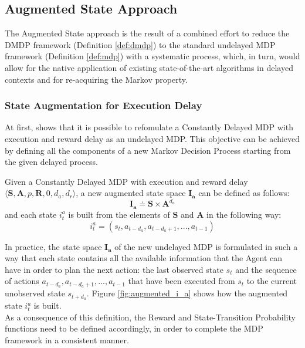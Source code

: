         \subsection{Augmented State Approach}
            \label{subs:augmentedapproach}
            The Augmented State approach is the result of a combined effort to reduce the DMDP framework (Definition \ref{def:dmdp}) to the standard undelayed MDP framework (Definition \ref{def:mdp}) with a systematic process, which, in turn, would allow for the native application of existing state-of-the-art algorithms in delayed contexts and for re-acquiring the Markov property.
            
            \subsubsection{State Augmentation for Execution Delay}
                At first,  shows that it is possible to refomulate a Constantly Delayed MDP with execution and reward delay as an undelayed MDP. This objective can be achieved by defining all the components of a new Markov Decision Process starting from the given delayed process.
                
                \begin{definition}
                    \label{def:execaugmentstate}
                    Given a Constantly Delayed MDP with execution and reward delay $\langle \mathbf{S}, \mathbf{A}, p, \mathbf{R}, 0, d_a, d_r \rangle$,
                    a new augmented state space $\mathbf{I_{a}}$ can be defined as follows:
                    \[ \mathbf{I_{a}} \doteq \mathbf{S} \times \mathbf{A}^{d_a} \]
                    and each state $i^a_t$ is built from the elements of $\mathbf{S}$ and $\mathbf{A}$ in the following way:
                    \[ i_t^a = \left( s_t, a_{t-d_{a}}, a_{t-d_{a}+1}, ..., a_{t-1} \right)\]
                \end{definition}
                
                In practice, the state space $\mathbf{I_{a}}$ of the new undelayed MDP is formulated in such a way that each state contains all the available information that the Agent can have in order to plan the next action: the last observed state $s_t$ and the sequence of actions ${a_{t-d_{a}}, a_{t-d_{a}+1}, ..., a_{t-1}}$ that have been executed from $s_t$ to the current unobserved state $s_{t+d_{a}}$. Figure \ref{fig:augmented_i_a} shows how the augmented state $i_t^a$ is built. 
                \\
                As a consequence of this definition, the Reward and State-Transition Probability functions need to be defined accordingly, in order to complete the MDP framework in a consistent manner.
                
